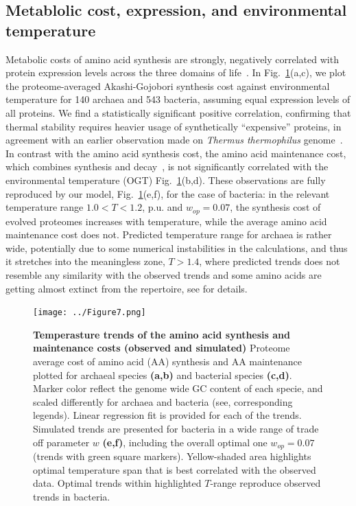 \documentclass[10pt,letterpaper]{article}
\begin{document}
\subsection{Metablolic cost, expression, and environmental temperature}

Metabolic costs of amino acid synthesis are strongly, negatively correlated with protein expression levels across the three domains of life~\cite{Akashi2002Metabolic,Swire2007Selection}.  In Fig.~\ref{fig:fig6}(a,c), we plot the proteome-averaged Akashi-Gojobori synthesis cost against environmental temperature for 140 archaea and 543 bacteria, assuming equal expression levels of all proteins. We find a statistically significant positive correlation, confirming that thermal stability requires heavier usage of synthetically ``expensive'' proteins, in agreement with an earlier observation made on {\it Thermus thermophilus} genome~\cite{Swire2007Selection}. In contrast with the amino acid synthesis cost, the amino acid maintenance cost, which combines synthesis and decay~\cite{Krick2014Amino}, is not significantly correlated with the environmental temperature (OGT) Fig.~\ref{fig:fig6}(b,d). These observations are fully reproduced by our model, Fig.~\ref{fig:fig6}(e,f), for the case of bacteria: in the relevant temperature range $1.0 < T < 1.2$, p.u. and $w_{op}=0.07$, the synthesis cost of evolved proteomes increases with temperature, while the average amino acid maintenance cost does not. Predicted temperature range for archaea is rather wide, potentially due to some numerical instabilities in the calculations, and thus it stretches into the meaningless zone, $T > 1.4$, where predicted trends does not resemble any similarity with the observed trends and some amino acids are getting almost extinct from the repertoire, see  for details.



\begin{figure}[h!]
\texttt{[image: ../Figure7.png]}
\caption{
{\bf Temperasture trends of the amino acid synthesis and maintenance costs (observed and simulated)}
Proteome average cost of amino acid (AA) synthesis and AA maintenance plotted for archaeal species {\bf (a,b)} and bacterial species {\bf (c,d)}. Marker color reflect the genome wide GC content of each specie, and scaled differently for archaea and bacteria (see, corresponding legends). Linear regression fit is provided for each of the trends.
Simulated trends are presented for bacteria in a wide range of trade off parameter $w$ {\bf (e,f)}, including the overall optimal one $w_{op}=0.07$ (trends with green square markers). Yellow-shaded area highlights optimal temperature span that is best correlated with the observed data. Optimal trends within highlighted $T$-range reproduce observed trends in bacteria.
}
\label{fig:fig6}
\end{figure}
\end{document}
